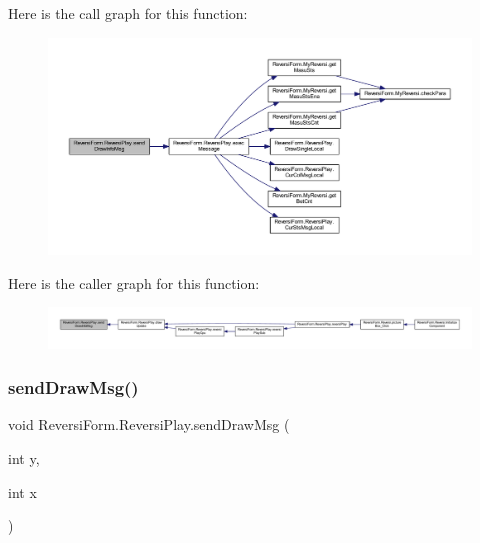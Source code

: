 Here is the call graph for this function\+:
\nopagebreak
\begin{figure}[H]
\begin{center}
\leavevmode
\includegraphics[width=350pt]{class_reversi_form_1_1_reversi_play_a08062d3bd42d1780a6931b44a925503d_cgraph}
\end{center}
\end{figure}
Here is the caller graph for this function\+:
\nopagebreak
\begin{figure}[H]
\begin{center}
\leavevmode
\includegraphics[width=350pt]{class_reversi_form_1_1_reversi_play_a08062d3bd42d1780a6931b44a925503d_icgraph}
\end{center}
\end{figure}
\mbox{\label{class_reversi_form_1_1_reversi_play_aaad592cdd92fb4efd6132c7cf1871e1f}} 
\subsubsection{\texorpdfstring{send\+Draw\+Msg()}{sendDrawMsg()}}
{\footnotesize\ttfamily void Reversi\+Form.\+Reversi\+Play.\+send\+Draw\+Msg (\begin{DoxyParamCaption}\item[{int}]{y,  }\item[{int}]{x }\end{DoxyParamCaption})}



